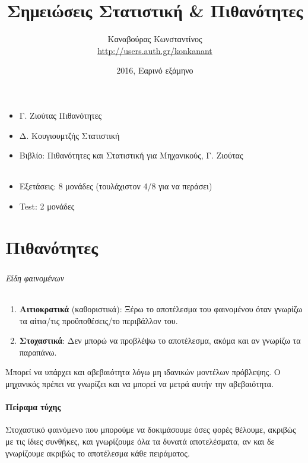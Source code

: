 \documentclass[11pt,a4paper,titlepage,draft]{article}
\title{Σημειώσεις Στατιστική \& Πιθανότητες}
\date{2016, Εαρινό εξάμηνο}
\author{Καναβούρας Κωνσταντίνος \\ \textlatin{\url{http://users.auth.gr/konkanant}}}
\begin{document}
\maketitle


\newpage

\begin{itemize}
\item Γ. Ζιούτας Πιθανότητες
\item Δ. Κουγιουμτζής Στατιστική
\item Βιβλίο: Πιθανότητες και Στατιστική για Μηχανικούς, Γ. Ζιούτας
\end{itemize}

\paragraph{}

\begin{itemize}
\item Εξετάσεις: 8 μονάδες (τουλάχιστον 4/8 για να περάσει)
\item \textlatin{Test}: 2 μονάδες
\end{itemize}

\part{Πιθανότητες}

\section{}
\paragraph{Είδη φαινομένων}

\begin{enumerate}
\item \textbf{Αιτιοκρατικά} (καθοριστικά): Ξέρω το αποτέλεσμα του φαινομένου όταν γνωρίζω τα αίτια/τις προϋποθέσεις/το περιβάλλον του.
\item \textbf{Στοχαστικά}: Δεν μπορώ να προβλέψω το αποτέλεσμα, ακόμα και αν γνωρίζω τα παραπάνω.
\end{enumerate}
Μπορεί να υπάρχει και αβεβαιότητα λόγω μη ιδανικών μοντέλων πρόβλεψης. Ο μηχανικός πρέπει να γνωρίζει και να μπορεί να μετρά αυτήν την αβεβαιότητα.

\subsection{Πείραμα τύχης}
Στοχαστικό φαινόμενο που μπορούμε να δοκιμάσουμε όσες φορές θέλουμε, ακριβώς με τις ίδιες συνθήκες, και γνωρίζουμε όλα τα δυνατά αποτελέσματα, αν και δε γνωρίζουμε ακριβώς το αποτέλεσμα κάθε πειράματος.
\end{document}
